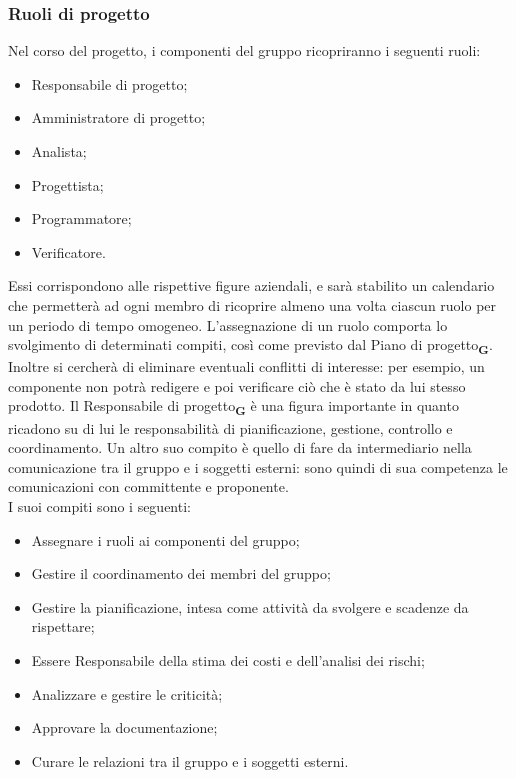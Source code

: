 \subsubsection{Ruoli di progetto}
Nel corso del progetto, i componenti del gruppo ricopriranno i seguenti ruoli:
\begin {itemize}
    \item Responsabile di progetto;
    \item Amministratore di progetto;
    \item Analista;
    \item Progettista;
    \item Programmatore;
    \item Verificatore.
\end {itemize}
Essi corrispondono alle rispettive figure aziendali, e sarà stabilito un calendario che permetterà ad ogni membro di ricoprire almeno una volta ciascun ruolo per un periodo di tempo omogeneo. L’assegnazione di un ruolo comporta lo svolgimento di determinati compiti, così come previsto dal Piano di progetto\textsubscript{\textbf{G}}. Inoltre si cercherà di eliminare eventuali conflitti di interesse: per esempio, un componente non potrà redigere e poi verificare ciò che è stato da lui stesso prodotto.
Il Responsabile di progetto\textsubscript{\textbf{G}} è una figura importante in quanto ricadono su di lui le responsabilità di pianificazione, gestione, controllo e coordinamento. Un altro suo compito è quello di fare da intermediario nella comunicazione tra il gruppo e i soggetti esterni: sono quindi di sua competenza le comunicazioni con committente e proponente.\\
I suoi compiti sono i seguenti:
\begin {itemize}
    \item Assegnare i ruoli ai componenti del gruppo;
    \item Gestire il coordinamento dei membri del gruppo;
    \item Gestire la pianificazione, intesa come attività da svolgere e scadenze da rispettare;
    \item Essere Responsabile della stima dei costi e dell’analisi dei rischi;
    \item Analizzare e gestire le criticità;
    \item Approvare la documentazione;
    \item Curare le relazioni tra il gruppo e i soggetti esterni.
\end {itemize}
